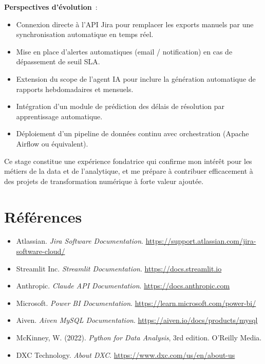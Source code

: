 \documentclass[12pt, a4paper]{report}
\begin{document}
\textbf{Perspectives d'évolution}~:
\begin{itemize}[leftmargin=2em]
    \item Connexion directe à l'API Jira pour remplacer les exports manuels par une synchronisation automatique en temps réel.
    \item Mise en place d'alertes automatiques (email / notification) en cas de dépassement de seuil SLA.
    \item Extension du scope de l'agent IA pour inclure la génération automatique de rapports hebdomadaires et mensuels.
    \item Intégration d'un module de prédiction des délais de résolution par apprentissage automatique.
    \item Déploiement d'un pipeline de données continu avec orchestration (Apache Airflow ou équivalent).
\end{itemize}

Ce stage constitue une expérience fondatrice qui confirme mon intérêt pour les métiers de la data et de l'analytique, et me prépare à contribuer efficacement à des projets de transformation numérique à forte valeur ajoutée.

\chapter*{Références}

\begin{itemize}[leftmargin=2em]
    \item Atlassian. \textit{Jira Software Documentation}. \url{https://support.atlassian.com/jira-software-cloud/}
    \item Streamlit Inc. \textit{Streamlit Documentation}. \url{https://docs.streamlit.io}
    \item Anthropic. \textit{Claude API Documentation}. \url{https://docs.anthropic.com}
    \item Microsoft. \textit{Power BI Documentation}. \url{https://learn.microsoft.com/power-bi/}
    \item Aiven. \textit{Aiven MySQL Documentation}. \url{https://aiven.io/docs/products/mysql}
    \item McKinney, W. (2022). \textit{Python for Data Analysis}, 3rd edition. O'Reilly Media.
    \item DXC Technology. \textit{About DXC}. \url{https://www.dxc.com/us/en/about-us}
\end{itemize}
\end{document}
